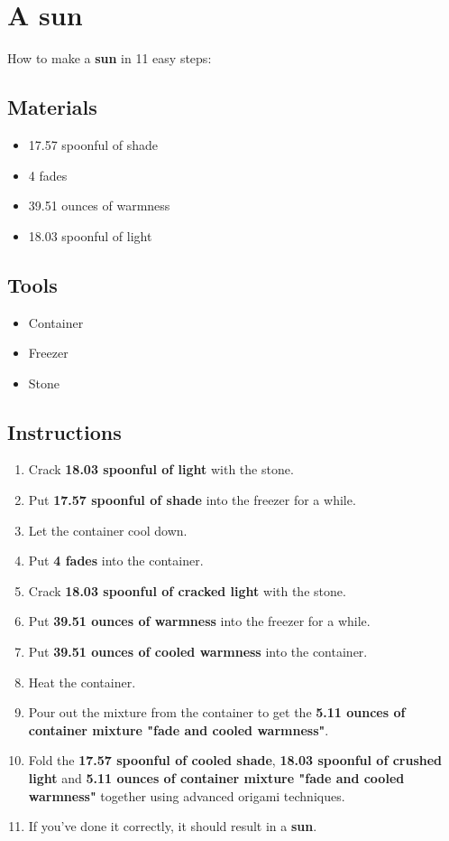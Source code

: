 \documentclass{article}
\begin{document}
\section{A sun}How to make a \textbf{sun} in 11 easy steps:

\subsection{Materials}\begin{itemize}
\item 
17.57 spoonful of shade
\item 
4 fades
\item 
39.51 ounces of warmness
\item 
18.03 spoonful of light
\end{itemize}
\subsection{Tools}\begin{itemize}
\item 
Container
\item 
Freezer
\item 
Stone
\end{itemize}
\subsection{Instructions}\begin{enumerate}
\item 
Crack \textbf{18.03 spoonful of light} with the stone.
\item 
Put \textbf{17.57 spoonful of shade} into the freezer for a while.
\item 
Let the container cool down.
\item 
Put \textbf{4 fades} into the container.
\item 
Crack \textbf{18.03 spoonful of cracked light} with the stone.
\item 
Put \textbf{39.51 ounces of warmness} into the freezer for a while.
\item 
Put \textbf{39.51 ounces of cooled warmness} into the container.
\item 
Heat the container.
\item 
Pour out the mixture from the container to get the \textbf{5.11 ounces of container mixture "fade and cooled warmness"}.
\item 
Fold the \textbf{17.57 spoonful of cooled shade}, \textbf{18.03 spoonful of crushed light} and \textbf{5.11 ounces of container mixture "fade and cooled warmness"} together using advanced origami techniques.
\item 
If you've done it correctly, it should result in a \textbf{sun}.
\end{enumerate}
\newpage
\end{document}
